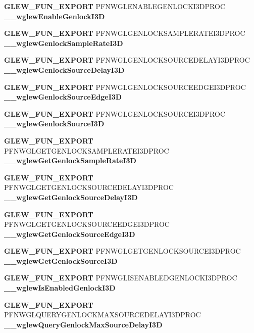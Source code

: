 \begin{DoxyCompactItemize}
\item 
{\bf G\+L\+E\+W\+\_\+\+F\+U\+N\+\_\+\+E\+X\+P\+O\+RT} P\+F\+N\+W\+G\+L\+E\+N\+A\+B\+L\+E\+G\+E\+N\+L\+O\+C\+K\+I3\+D\+P\+R\+OC {\bf \+\_\+\+\_\+wglew\+Enable\+Genlock\+I3D}
\item 
{\bf G\+L\+E\+W\+\_\+\+F\+U\+N\+\_\+\+E\+X\+P\+O\+RT} P\+F\+N\+W\+G\+L\+G\+E\+N\+L\+O\+C\+K\+S\+A\+M\+P\+L\+E\+R\+A\+T\+E\+I3\+D\+P\+R\+OC {\bf \+\_\+\+\_\+wglew\+Genlock\+Sample\+Rate\+I3D}
\item 
{\bf G\+L\+E\+W\+\_\+\+F\+U\+N\+\_\+\+E\+X\+P\+O\+RT} P\+F\+N\+W\+G\+L\+G\+E\+N\+L\+O\+C\+K\+S\+O\+U\+R\+C\+E\+D\+E\+L\+A\+Y\+I3\+D\+P\+R\+OC {\bf \+\_\+\+\_\+wglew\+Genlock\+Source\+Delay\+I3D}
\item 
{\bf G\+L\+E\+W\+\_\+\+F\+U\+N\+\_\+\+E\+X\+P\+O\+RT} P\+F\+N\+W\+G\+L\+G\+E\+N\+L\+O\+C\+K\+S\+O\+U\+R\+C\+E\+E\+D\+G\+E\+I3\+D\+P\+R\+OC {\bf \+\_\+\+\_\+wglew\+Genlock\+Source\+Edge\+I3D}
\item 
{\bf G\+L\+E\+W\+\_\+\+F\+U\+N\+\_\+\+E\+X\+P\+O\+RT} P\+F\+N\+W\+G\+L\+G\+E\+N\+L\+O\+C\+K\+S\+O\+U\+R\+C\+E\+I3\+D\+P\+R\+OC {\bf \+\_\+\+\_\+wglew\+Genlock\+Source\+I3D}
\item 
{\bf G\+L\+E\+W\+\_\+\+F\+U\+N\+\_\+\+E\+X\+P\+O\+RT} P\+F\+N\+W\+G\+L\+G\+E\+T\+G\+E\+N\+L\+O\+C\+K\+S\+A\+M\+P\+L\+E\+R\+A\+T\+E\+I3\+D\+P\+R\+OC {\bf \+\_\+\+\_\+wglew\+Get\+Genlock\+Sample\+Rate\+I3D}
\item 
{\bf G\+L\+E\+W\+\_\+\+F\+U\+N\+\_\+\+E\+X\+P\+O\+RT} P\+F\+N\+W\+G\+L\+G\+E\+T\+G\+E\+N\+L\+O\+C\+K\+S\+O\+U\+R\+C\+E\+D\+E\+L\+A\+Y\+I3\+D\+P\+R\+OC {\bf \+\_\+\+\_\+wglew\+Get\+Genlock\+Source\+Delay\+I3D}
\item 
{\bf G\+L\+E\+W\+\_\+\+F\+U\+N\+\_\+\+E\+X\+P\+O\+RT} P\+F\+N\+W\+G\+L\+G\+E\+T\+G\+E\+N\+L\+O\+C\+K\+S\+O\+U\+R\+C\+E\+E\+D\+G\+E\+I3\+D\+P\+R\+OC {\bf \+\_\+\+\_\+wglew\+Get\+Genlock\+Source\+Edge\+I3D}
\item 
{\bf G\+L\+E\+W\+\_\+\+F\+U\+N\+\_\+\+E\+X\+P\+O\+RT} P\+F\+N\+W\+G\+L\+G\+E\+T\+G\+E\+N\+L\+O\+C\+K\+S\+O\+U\+R\+C\+E\+I3\+D\+P\+R\+OC {\bf \+\_\+\+\_\+wglew\+Get\+Genlock\+Source\+I3D}
\item 
{\bf G\+L\+E\+W\+\_\+\+F\+U\+N\+\_\+\+E\+X\+P\+O\+RT} P\+F\+N\+W\+G\+L\+I\+S\+E\+N\+A\+B\+L\+E\+D\+G\+E\+N\+L\+O\+C\+K\+I3\+D\+P\+R\+OC {\bf \+\_\+\+\_\+wglew\+Is\+Enabled\+Genlock\+I3D}
\item 
{\bf G\+L\+E\+W\+\_\+\+F\+U\+N\+\_\+\+E\+X\+P\+O\+RT} P\+F\+N\+W\+G\+L\+Q\+U\+E\+R\+Y\+G\+E\+N\+L\+O\+C\+K\+M\+A\+X\+S\+O\+U\+R\+C\+E\+D\+E\+L\+A\+Y\+I3\+D\+P\+R\+OC {\bf \+\_\+\+\_\+wglew\+Query\+Genlock\+Max\+Source\+Delay\+I3D}

\end{DoxyCompactItemize}
